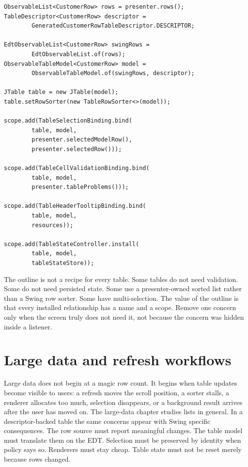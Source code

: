 \begin{lstlisting}[caption={One reviewable table assembly outline.}]
ObservableList<CustomerRow> rows = presenter.rows();
TableDescriptor<CustomerRow> descriptor =
        GeneratedCustomerRowTableDescriptor.DESCRIPTOR;

EdtObservableList<CustomerRow> swingRows =
        EdtObservableList.of(rows);
ObservableTableModel<CustomerRow> model =
        ObservableTableModel.of(swingRows, descriptor);

JTable table = new JTable(model);
table.setRowSorter(new TableRowSorter<>(model));

scope.add(TableSelectionBinding.bind(
        table, model,
        presenter.selectedModelRow(),
        presenter.selectedRow()));

scope.add(TableCellValidationBinding.bind(
        table, model,
        presenter.tableProblems()));

scope.add(TableHeaderTooltipBinding.bind(
        table, model,
        resources));

scope.add(TableStateController.install(
        table, model,
        tableStateStore));
\end{lstlisting}

The outline is not a recipe for every table. Some tables do not need
validation. Some do not need persisted state. Some use a presenter-owned
sorted list rather than a Swing row sorter. Some have multi-selection. The
value of the outline is that every installed relationship has a name and a
scope. Remove one concern only when the screen truly does not need it, not
because the concern was hidden inside a listener.

\section{Large data and refresh workflows}

Large data does not begin at a magic row count. It begins when table updates
become visible to users: a refresh moves the scroll position, a sorter stalls,
a renderer allocates too much, selection disappears, or a background result
arrives after the user has moved on. The large-data chapter studies lists in
general. In a descriptor-backed table the same concerns appear with Swing
specific consequences. The row source must report meaningful changes. The
table model must translate them on the EDT. Selection must be preserved by
identity when policy says so. Renderers must stay cheap. Table state must not
be reset merely because rows changed.

